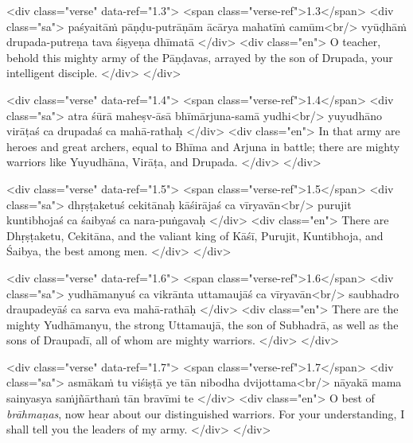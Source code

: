 \begin{html}
<div class="verse" data-ref="1.3">
  <span class="verse-ref">1.3</span>
  <div class="sa">
    paśyaitāṁ pāṇḍu-putrāṇām ācārya mahatīṁ camūm<br/>
    vyūḍhāṁ drupada-putreṇa tava śiṣyeṇa dhīmatā
  </div>
  <div class="en">
    O teacher, behold this mighty army of the Pāṇḍavas, arrayed by the son of Drupada, your intelligent disciple.
  </div>
</div>
\end{html}



\begin{html}
<div class="verse" data-ref="1.4">
  <span class="verse-ref">1.4</span>
  <div class="sa">
    atra śūrā maheṣv-āsā bhīmārjuna-samā yudhi<br/>
    yuyudhāno virāṭaś ca drupadaś ca mahā-rathaḥ
  </div>
  <div class="en">
    In that army are heroes and great archers, equal to Bhīma and Arjuna in battle; there are mighty warriors like Yuyudhāna, Virāṭa, and Drupada.
  </div>
</div>
\end{html}



\begin{html}
<div class="verse" data-ref="1.5">
  <span class="verse-ref">1.5</span>
  <div class="sa">
    dhṛṣṭaketuś cekitānaḥ kāśirājaś ca vīryavān<br/>
    purujit kuntibhojaś ca śaibyaś ca nara-puṅgavaḥ
  </div>
  <div class="en">
    There are Dhṛṣṭaketu, Cekitāna, and the valiant king of Kāśī, Purujit, Kuntibhoja, and Śaibya, the best among men.
  </div>
</div>
\end{html}



\begin{html}
<div class="verse" data-ref="1.6">
  <span class="verse-ref">1.6</span>
  <div class="sa">
    yudhāmanyuś ca vikrānta uttamaujāś ca vīryavān<br/>
    saubhadro draupadeyāś ca sarva eva mahā-rathāḥ
  </div>
  <div class="en">
    There are the mighty Yudhāmanyu, the strong Uttamaujā, the son of Subhadrā, as well as the sons of Draupadī, all of whom are mighty warriors.
  </div>
</div>
\end{html}



\begin{html}
<div class="verse" data-ref="1.7">
  <span class="verse-ref">1.7</span>
  <div class="sa">
    asmākaṁ tu viśiṣṭā ye tān nibodha dvijottama<br/>
    nāyakā mama sainyasya saṁjñārthaṁ tān bravīmi te
  </div>
  <div class="en">
    O best of \textit{brāhmaṇas}, now hear about our distinguished warriors. For your understanding, I shall tell you the leaders of my army.
  </div>
</div>
\end{html}



